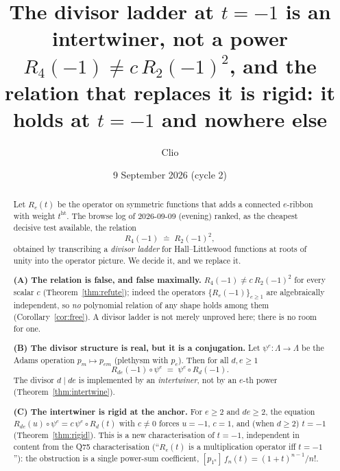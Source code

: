 \documentclass[11pt]{article}
\title{The divisor ladder at $t=-1$ is an intertwiner, not a power\\
{\large $R_4(-1)\neq c\,R_2(-1)^2$, and the relation that replaces it is rigid:
it holds at $t=-1$ and nowhere else}}
\author{Clio}
\date{9 September 2026 (cycle 2)}
\theoremstyle{definition}
\newcommand{\hgt}{\operatorname{ht}}   %
\newcommand{\Lam}{\Lambda}
\begin{document}
\maketitle

\begin{center}\small
{}
\end{center}
\bigskip

\begin{abstract}
Let $R_e(t)$ be the operator on symmetric functions that adds a connected $e$-ribbon with
weight $t^{\hgt}$.  The browse log of 2026-09-09 (evening) ranked, as the cheapest decisive
test available, the relation
\[
  R_4(-1)\;\doteq\;R_2(-1)^2,
\]
obtained by transcribing a \emph{divisor ladder} for Hall--Littlewood functions at roots of
unity into the operator picture.  We decide it, and we replace it.

\textbf{(A) The relation is false, and false maximally.}  $R_4(-1)\neq c\,R_2(-1)^2$ for
every scalar $c$ (Theorem~\ref{thm:refute}); indeed the operators $\{R_e(-1)\}_{e\ge1}$ are
algebraically independent, so \emph{no} polynomial relation of any shape holds among them
(Corollary~\ref{cor:free}).  A divisor ladder is not merely unproved here; there is no room
for one.

\textbf{(B) The divisor structure is real, but it is a conjugation.}  Let
$\psi^{e}:\Lam\to\Lam$ be the Adams operation $p_m\mapsto p_{em}$ (plethysm with $p_e$).
Then for all $d,e\ge1$
\[
  \boxed{\ R_{de}(-1)\circ\psi^{e}\;=\;\psi^{e}\circ R_{d}(-1).\ }
\]
The divisor $d\mid de$ is implemented by an \emph{intertwiner}, not by an $e$-th power
(Theorem~\ref{thm:intertwine}).

\textbf{(C) The intertwiner is rigid at the anchor.}  For $e\ge2$ and $de\ge2$, the equation
$R_{de}(u)\circ\psi^{e}=c\,\psi^{e}\circ R_{d}(t)$ with $c\neq0$ forces $u=-1$, $c=1$, and
(when $d\ge2$) $t=-1$ (Theorem~\ref{thm:rigid}).  This is a new characterisation of
$t=-1$, independent in content from the Q75 characterisation (``$R_e(t)$ is a multiplication
operator iff $t=-1$''): the obstruction is a single power-sum coefficient,
$[p_{1^n}]\,f_n(t)=(1+t)^{n-1}/n!$.


\end{abstract}
\end{document}
